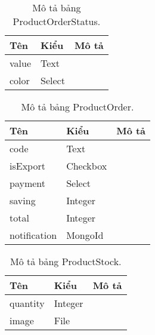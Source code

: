 \begin{table}[h!]
\begin{center}
\begin{tabular}{ |l|l|l| } 
	\hline
	Tên & Kiểu & Mô tả \\
	\hline
	value & Text & \dotfill \\
color & Select & \dotfill \\ 
	\hline
\end{tabular}
	\caption{Mô tả bảng ProductOrderStatus.}
	\label{table:ProductOrderStatus}
\end{center}
\end{table}


\begin{table}[h!]
\begin{center}
\begin{tabular}{ |l|l|l| } 
	\hline
	Tên & Kiểu & Mô tả \\
	\hline
	code & Text & \dotfill \\
isExport & Checkbox & \dotfill \\
payment & Select & \dotfill \\
saving & Integer & \dotfill \\
total & Integer & \dotfill \\
notification & MongoId & \dotfill \\ 
	\hline
\end{tabular}
	\caption{Mô tả bảng ProductOrder.}
	\label{table:ProductOrder}
\end{center}
\end{table}


\begin{table}[h!]
\begin{center}
\begin{tabular}{ |l|l|l| } 
	\hline
	Tên & Kiểu & Mô tả \\
	\hline
	quantity & Integer & \dotfill \\
image & File & \dotfill \\ 
	\hline
\end{tabular}
	\caption{Mô tả bảng ProductStock.}
	\label{table:ProductStock}
\end{center}
\end{table}


